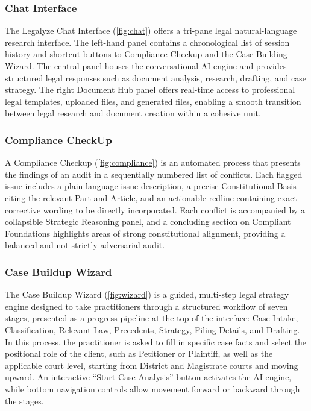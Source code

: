\subsubsection{Chat Interface}

The Legalyze Chat Interface (\autoref{fig:chat}) offers a tri-pane legal natural-language research interface. The left-hand panel contains a chronological list of session history and shortcut buttons to Compliance Checkup and the Case Building Wizard. The central panel houses the conversational AI engine and provides structured legal responses such as document analysis, research, drafting, and case strategy. The right Document Hub panel offers real-time access to professional legal templates, uploaded files, and generated files, enabling a smooth transition between legal research and document creation within a cohesive unit.

\subsubsection{Compliance CheckUp}

A Compliance Checkup (\autoref{fig:compliance}) is an automated process that presents the findings of an audit in a sequentially numbered list of conflicts. Each flagged issue includes a plain-language issue description, a precise Constitutional Basis citing the relevant Part and Article, and an actionable redline containing exact corrective wording to be directly incorporated. Each conflict is accompanied by a collapsible Strategic Reasoning panel, and a concluding section on Compliant Foundations highlights areas of strong constitutional alignment, providing a balanced and not strictly adversarial audit.

\subsubsection{Case Buildup Wizard}

The Case Buildup Wizard (\autoref{fig:wizard}) is a guided, multi-step legal strategy engine designed to take practitioners through a structured workflow of seven stages, presented as a progress pipeline at the top of the interface: Case Intake, Classification, Relevant Law, Precedents, Strategy, Filing Details, and Drafting. In this process, the practitioner is asked to fill in specific case facts and select the positional role of the client, such as Petitioner or Plaintiff, as well as the applicable court level, starting from District and Magistrate courts and moving upward. An interactive ``Start Case Analysis'' button activates the AI engine, while bottom navigation controls allow movement forward or backward through the stages.


